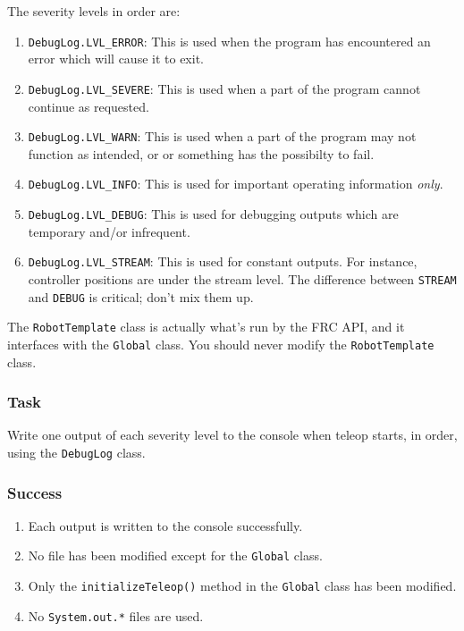 \documentclass[a4paper]{article}
\begin{document}
The severity levels in order are:

\begin{enumerate}\item{\lstinline{DebugLog.LVL_ERROR}: This is used when the program has encountered an error which will cause it to exit.}\item{\lstinline{DebugLog.LVL_SEVERE}: This is used when a part of the program cannot continue as requested.}\item{\lstinline{DebugLog.LVL_WARN}: This is used when a part of the program may not function as intended, or or something has the possibilty to fail.}\item{\lstinline{DebugLog.LVL_INFO}: This is used for important operating information \textit{only}.}\item{\lstinline{DebugLog.LVL_DEBUG}: This is used for debugging outputs which are temporary and/or infrequent.}\item{\lstinline{DebugLog.LVL_STREAM}: This is used for constant outputs. For instance, controller positions are under the stream level. The difference between \lstinline{STREAM} and \lstinline{DEBUG} is critical; don't mix them up.}\end{enumerate}

The \lstinline{RobotTemplate} class is actually what's run by the FRC API, and it interfaces with the \lstinline{Global} class. You should never modify the \lstinline{RobotTemplate} class.

\subsubsection{Task} Write one output of each severity level to the console when teleop starts, in order, using the \lstinline{DebugLog} class.
\subsubsection{Success} \begin{enumerate}\item{Each output is written to the console successfully.}\item{No file has been modified except for the \lstinline{Global} class.}\item{Only the \lstinline{initializeTeleop()} method in the \lstinline{Global} class has been modified.}\item{No \lstinline{System.out.*} files are used.}\end{enumerate}
\end{document}
